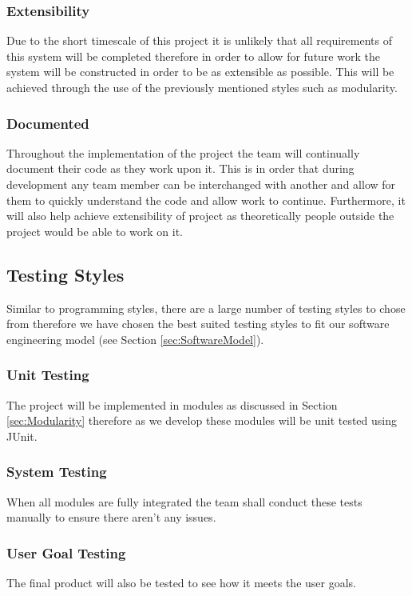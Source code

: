 \subsubsection{Extensibility}
Due to the short timescale of this project it is unlikely that all requirements of this system will be completed therefore in order to allow for future work the system will be constructed in order to be as extensible as possible. This will be achieved through the use of the previously mentioned styles such as modularity.

\subsubsection{Documented}
Throughout the implementation of the project the team will continually document their code as they work upon it. This is in order that during development any team member can be interchanged with another and allow for them to quickly understand the code and allow work to continue. Furthermore, it will also help achieve extensibility of project as theoretically people outside the project would be able to work on it. 

\subsection{Testing Styles}
\label{TestingStyles}

Similar to programming styles, there are a large number of testing styles \cite{citeCleanroom} to chose from therefore we have chosen the best suited testing styles to fit our software engineering model (see Section \ref{sec:SoftwareModel}).

\subsubsection{Unit Testing}
The project will be implemented in modules as discussed in Section \ref{sec:Modularity} therefore as we develop these modules will be unit tested using JUnit. 

\subsubsection{System Testing}
When all modules are fully integrated the team shall conduct these tests manually to ensure there aren’t any issues.

\subsubsection{User Goal Testing}
The final product will also be tested to see how it meets the user goals.

